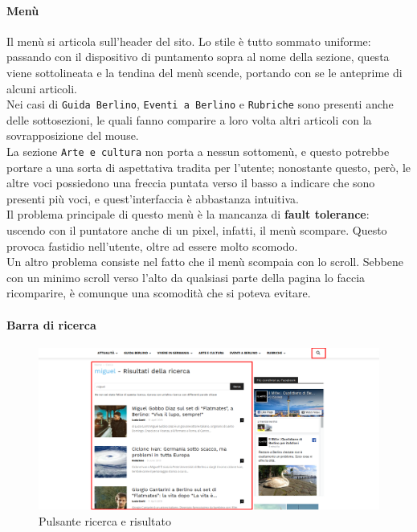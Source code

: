 \paragraph*{Menù}
Il menù si articola sull'header del sito. Lo stile è tutto sommato uniforme: passando con il dispositivo di puntamento sopra al nome della sezione, questa viene sottolineata e la tendina del menù scende, portando con se le anteprime di alcuni articoli. \\
Nei casi di \texttt{Guida Berlino}, \texttt{Eventi a Berlino} e \texttt{Rubriche} sono presenti anche delle sottosezioni, le quali fanno comparire a loro volta altri articoli con la sovrapposizione del mouse. \\
La sezione \texttt{Arte e cultura} non porta a nessun sottomenù, e questo potrebbe portare a una sorta di aspettativa tradita per l'utente; nonostante questo, però, le altre voci possiedono una freccia puntata verso il basso a indicare che sono presenti più voci, e quest'interfaccia è abbastanza intuitiva. \\
Il problema principale di questo menù è la mancanza di \textbf{fault tolerance}: uscendo con il puntatore anche di un pixel, infatti, il menù scompare. Questo provoca fastidio nell'utente, oltre ad essere molto scomodo. \\
Un altro problema consiste nel fatto che il menù scompaia con lo scroll. Sebbene con un minimo scroll verso l'alto da qualsiasi parte della pagina lo faccia ricomparire, è comunque una scomodità che si poteva evitare.

\paragraph*{Barra di ricerca}

\vspace{30pt}
\begin{figure}[htbp]
\begin{center}
\includegraphics[width=35em]{img/ricerca}
\caption{Pulsante ricerca e risultato}
\end{center}
\end{figure}
\vspace{30pt}

